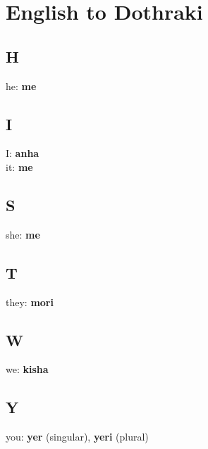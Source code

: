 \section*{English to Dothraki}
\begin{multicols}{2}
\subsection*{H}
he: \textbf{me} \\
\subsection*{I}
I: \textbf{anha} \\
it: \textbf{me} \\
\subsection*{S}
she: \textbf{me} \\
\subsection*{T}
they: \textbf{mori} \\
\subsection*{W}
we: \textbf{kisha} \\
\subsection*{Y}
you: \textbf{yer} (singular), \textbf{yeri} (plural) \\
\end{multicols}
